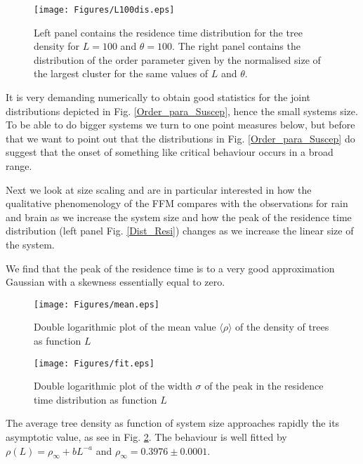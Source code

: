 \documentclass[aps,prl,showpacs,superscriptaddress,groupedaddress,notitlepage]{revtex4-1}
\begin{document}
\begin{figure}[!h]
\centering
\texttt{[image: Figures/L100dis.eps]}\\
\caption{Left panel contains the residence time distribution for the tree density for $L=100$ and $\theta=100$. The right panel contains the distribution of the order parameter given by the normalised size of the largest cluster for the same values of $L$ and $\theta$.}
\label{Dist_Resi}
\label{pairs}
\end{figure}
  It is very demanding numerically to obtain good statistics for the joint distributions depicted in Fig. \ref{Order_para_Suscep}, hence the small systems size. To be able to do bigger systems we turn to one point measures below, but before that we want to point out that the distributions in Fig. \ref{Order_para_Suscep} do suggest that the onset of something like critical behaviour occurs in a broad range. 

Next we look at size scaling and are in particular interested in how the qualitative phenomenology of the FFM compares with the observations for rain and brain as we increase the system size and how the peak of the residence time distribution (left panel Fig. \ref{Dist_Resi}) changes as we increase the linear size of the system.  

We find that the peak of the residence time is to a very good approximation Gaussian with a skewness essentially equal to zero.   

\begin{figure}[!h]
\centering
\texttt{[image: Figures/mean.eps]}\\
  
\caption{Double logarithmic plot of the mean value $\langle \rho\rangle$  of the density of trees as function $L$}
\label{mean_rho}
\end{figure}


\begin{figure}[!h]
\centering
\texttt{[image: Figures/fit.eps]}\\
  
\caption{Double logarithmic plot of the width $\sigma$ of the peak in the residence time distribution as function $L$}
\label{std(rho)}
\end{figure}

 
The average tree density as function of system size approaches rapidly the its asymptotic value, as see in Fig. \ref{mean_rho}. The behaviour is well fitted by $\rho(L)=\rho_\infty+bL^{-a} $ and $\rho_\infty=0.3976\pm 0.0001$.
\end{document}
